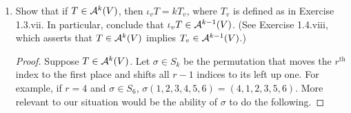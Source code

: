 \documentclass[../psets.tex]{subfiles}
\begin{document}
\begin{enumerate}[label={\textbf{1.7.\roman*.}}]
\begin{proof}
\begin{align*}
\begin{split}
            \end{split}\\
            \begin{split}
                ={}& \sum_{r=1}^p(-1)^{r-1}T_1(v_1,\dots,v_{r-1},v,v_r,\dots,v_{p-1})T_2(v_p,\dots,v_{p+q-1})\\
                &+\sum_{r=p+1}^{p+q}(-1)^{r-1}T_1(v_1,\dots,v_p)T_2(v_{p+1},\dots,v_{r-1},v,v_r,\dots,v_{p+q-1})
            \end{split}\\
            \begin{split}
                ={}& \left[ \sum_{r=1}^p(-1)^{r-1}T_1(v_1,\dots,v_{r-1},v,v_r,\dots,v_{p-1}) \right]\cdot T_2(v_p,\dots,v_{p+q-1})\\
                &+T_1(v_1,\dots,v_p)\cdot\sum_{r=p+1}^{p+q}(-1)^{r-1}T_2(v_{p+1},\dots,v_{r-1},v,v_r,\dots,v_{p+q-1})
            \end{split}\\
            \begin{split}
                ={}& \left[ \sum_{r=1}^p(-1)^{r-1}T_1(v_1,\dots,v_{r-1},v,v_r,\dots,v_{p-1}) \right]\cdot T_2(v_p,\dots,v_{p+q-1})\\
                &+T_1(v_1,\dots,v_p)\cdot(-1)^p\sum_{r=1}^q(-1)^{r-1}T_2(v_{p+1},\dots,v_{p+r-1},v,v_{p+r},\dots,v_{p+q-1})
            \end{split}\\
            \begin{split}
                ={}& (\iota_vT_1)(v_1,\dots,v_{p-1})\cdot T_2(v_p,\dots,v_{p+q-1})\\
                &+(-1)^pT_1(v_1,\dots,v_p)\cdot(\iota_vT_2)(v_{p+1},\dots,v_{p+q-1})
            \end{split}\\
            ={}& (\iota_vT_1\otimes T_2)(v_1,\dots,v_{p+q-1})+(-1)^p(T_1\otimes\iota_vT_2)(v_1,\dots,v_{p+q-1})\\
            ={}& [\iota_vT_1\otimes T_2+(-1)^pT_1\otimes\iota_vT_2](v_1,\dots,v_{p+q-1})
        \end{align*}
        as desired.
    \end{proof}
    \item Show that if $T\in\alt[k]{V}$, then $\iota_vT=kT_v$, where $T_v$ is defined as in Exercise 1.3.vii. In particular, conclude that $\iota_vT\in\alt[k-1]{V}$. (See Exercise 1.4.viii, which asserts that $T\in\alt[k]{V}$ implies $T_v\in\alt[k-1]{V}$.)
    \begin{proof}
        Suppose $T\in\alt[k]{V}$. Let $\sigma\in S_k$ be the permutation that moves the $r^\text{th}$ index to the first place and shifts all $r-1$ indices to its left up one. For example, if $r=4$ and $\sigma\in S_6$, $\sigma(1,2,3,4,5,6)=(4,1,2,3,5,6)$. More relevant to our situation would be the ability of $\sigma$ to do the following.

\end{proof}
\end{enumerate}
\end{document}
